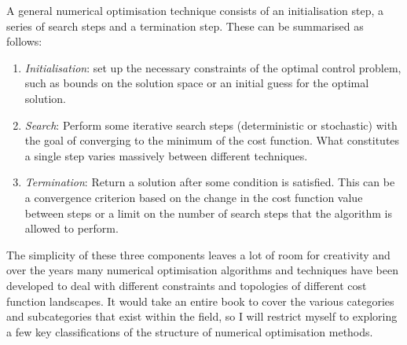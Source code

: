 A general numerical optimisation technique consists of an initialisation step, a series of search steps and a termination step. These can be summarised as follows:
\begin{enumerate}
    \item \emph{Initialisation}: set up the necessary constraints of the optimal control problem, such as bounds on the solution space or an initial guess for the optimal solution.
    \item \emph{Search}: Perform some iterative search steps (deterministic or stochastic) with the goal of converging to the minimum of the cost function. What constitutes a single step varies massively between different techniques.
    \item \emph{Termination}: Return a solution after some condition is satisfied. This can be a convergence criterion based on the change in the cost function value between steps or a limit on the number of search steps that the algorithm is allowed to perform.
\end{enumerate}

The simplicity of these three components leaves a lot of room for creativity and over the years many numerical optimisation algorithms and techniques have been developed to deal with different constraints and topologies of different cost function landscapes. It would take an entire book \cite{nocedal_numerical_2006} to cover the various categories and subcategories that exist within the field, so I will restrict myself to exploring a few key classifications of the structure of numerical optimisation methods. 

